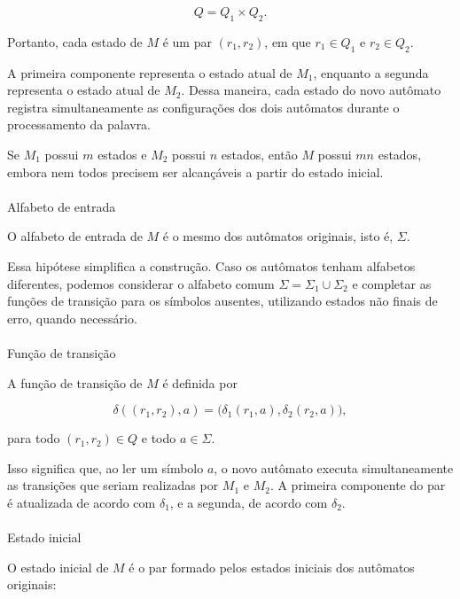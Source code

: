 \documentclass[
  brazilian,
  letterpaper,
]{book}
\makeatletter
\let\oldparagraph\paragraph
\renewcommand{\paragraph}{
    \@ifstar
      \xxxParagraphStar
      \xxxParagraphNoStar
  }
\newcommand{\xxxParagraphStar}[1]{\oldparagraph*{#1}\mbox{}}
\newcommand{\xxxParagraphNoStar}[1]{\oldparagraph{#1}\mbox{}}
\theoremstyle{plain}
\theoremstyle{definition}
\theoremstyle{remark}
\makeatother
\begin{document}
\[
Q = Q_1 \times Q_2.
\]

Portanto, cada estado de \(M\) é um par \((r_1, r_2)\), em que
\(r_1 \in Q_1\) e \(r_2 \in Q_2\).

A primeira componente representa o estado atual de \(M_1\), enquanto a
segunda representa o estado atual de \(M_2\). Dessa maneira, cada estado
do novo autômato registra simultaneamente as configurações dos dois
autômatos durante o processamento da palavra.

Se \(M_1\) possui \(m\) estados e \(M_2\) possui \(n\) estados, então
\(M\) possui \(mn\) estados, embora nem todos precisem ser alcançáveis a
partir do estado inicial.

\paragraph{Alfabeto de entrada}\label{alfabeto-de-entrada}

O alfabeto de entrada de \(M\) é o mesmo dos autômatos originais, isto
é, \(\Sigma\).

Essa hipótese simplifica a construção. Caso os autômatos tenham
alfabetos diferentes, podemos considerar o alfabeto comum
\(\Sigma = \Sigma_1 \cup \Sigma_2\) e completar as funções de transição
para os símbolos ausentes, utilizando estados não finais de erro, quando
necessário.

\paragraph{Função de transição}\label{funuxe7uxe3o-de-transiuxe7uxe3o}

A função de transição de \(M\) é definida por

\[
\delta((r_1,r_2),a)
=
\bigl(\delta_1(r_1,a),\delta_2(r_2,a)\bigr),
\]

para todo \((r_1,r_2) \in Q\) e todo \(a \in \Sigma\).

Isso significa que, ao ler um símbolo \(a\), o novo autômato executa
simultaneamente as transições que seriam realizadas por \(M_1\) e
\(M_2\). A primeira componente do par é atualizada de acordo com
\(\delta_1\), e a segunda, de acordo com \(\delta_2\).

\paragraph{Estado inicial}\label{estado-inicial}

O estado inicial de \(M\) é o par formado pelos estados iniciais dos
autômatos originais:
\end{document}
